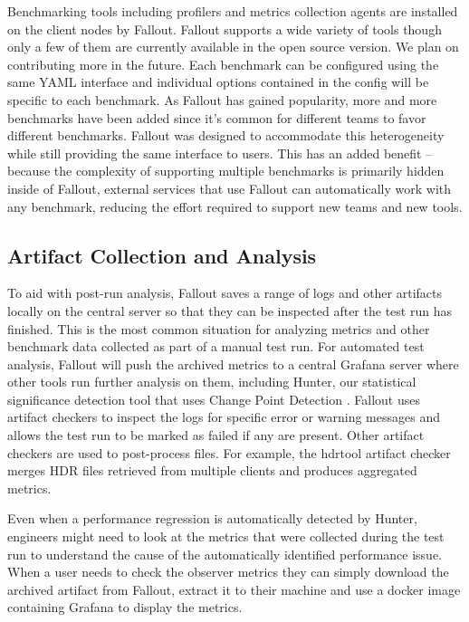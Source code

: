 \documentclass[a4paper,fleqn]{cas-dc}
\begin{document}
Benchmarking tools including profilers and metrics collection agents are installed on the client
nodes by Fallout. Fallout supports a wide variety of tools though only a few of them are currently
available in the open source version. We plan on contributing more in the future. Each benchmark can
be configured using the same YAML interface and individual options contained in the config will
be specific to each benchmark. As Fallout has gained popularity, more and more benchmarks have been
added since it’s common for different teams to favor different benchmarks. Fallout was designed to
accommodate this heterogeneity while still providing the same interface to users. This has an added
benefit -- because the complexity of supporting multiple benchmarks is primarily hidden inside of
Fallout, external services that use Fallout can automatically work with any benchmark, reducing the
effort required to support new teams and new tools.

\subsection{Artifact Collection and Analysis}

To aid with post-run analysis, Fallout saves a range of logs and other artifacts locally on the
central server so that they can be inspected after the test run has finished. This is the most
common situation for analyzing metrics and other benchmark data collected as part of a manual test
run. For automated test analysis, Fallout will push the archived metrics to a central Grafana server
where other tools run further analysis on them, including Hunter, our statistical significance
detection tool that uses Change Point Detection \cite{CPD}. Fallout uses
artifact checkers to inspect the logs for specific error or warning messages and allows the test run
to be marked as failed if any are present. Other artifact checkers are used to post-process files.
For example, the hdrtool artifact checker merges HDR files retrieved from multiple clients and
produces aggregated metrics.

Even when a performance regression is automatically detected by Hunter, engineers might need to look
at the metrics that were collected during the test run to understand the cause of the automatically
identified performance issue. When a user needs to check the observer metrics they can simply
download the archived artifact from Fallout, extract it to their machine and use a docker image
containing Grafana to display the metrics.
\end{document}
